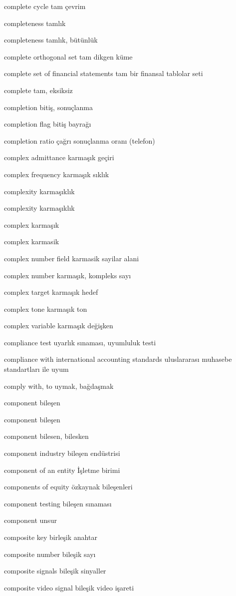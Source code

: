 \documentclass[12pt,fleqn]{article}\usepackage{../../common}
\begin{document}
complete cycle tam çevrim

completeness tamlık

completeness tamlık, bütünlük

complete orthogonal set tam dikgen küme

complete set of financial statements tam bir finansal tablolar seti

complete tam, eksiksiz

completion bitiş, sonuçlanma

completion flag bitiş bayrağı

completion ratio çağrı sonuçlanma oranı (telefon)

complex admittance karmaşık geçiri

complex frequency karmaşık sıklık

complexity karmaşıklık

complexity karmaşıklık

complex karmaşık

complex karmasik

complex number field karmasik sayilar alani

complex number karmaşık, kompleks sayı

complex target karmaşık hedef

complex tone karmaşık ton

complex variable karmaşık değişken

compliance test uyarlık sınaması, uyumluluk testi

compliance with international accounting standards uluslararası muhasebe standartları ile uyum

comply with, to uymak, bağdaşmak

component bileşen

component bileşen

component bilesen, bilesken

component industry bileşen endüstrisi

component of an entity İşletme birimi

components of equity özkaynak bileşenleri

component testing bileşen sınaması

component unsur

composite key birleşik anahtar

composite number bileşik sayı

composite signals bileşik sinyaller

composite video signal bileşik video işareti
\end{document}
